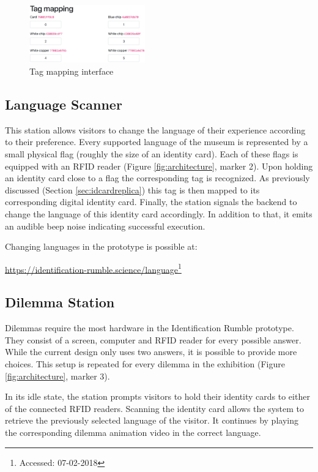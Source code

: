 \begin{figure}[h]
  \includegraphics[width=5cm]{assets/mapping-interface.png}
  \caption{Tag mapping interface}
  \centering
  \label{fig:mappinginterface}
\end{figure}


\subsection{Language Scanner}
This station allows visitors to change the language of their experience according to their preference.
Every supported language of the museum is represented by a small physical flag (roughly the size of an identity card).
Each of these flags is equipped with an RFID reader (Figure \ref{fig:architecture}, marker 2).
Upon holding an identity card close to a flag the corresponding tag is recognized.
As previously discussed (Section \ref{sec:idcardreplica}) this tag is then mapped to its corresponding digital identity card.
Finally, the station signals the backend to change the language of this identity card accordingly.
In addition to that, it emits an audible beep noise indicating successful execution.

Changing languages in the prototype is possible at:

\begin{flushleft}
  \url{https://identification-rumble.science/language}\footnote{Accessed: 07-02-2018}
\end{flushleft}


\subsection{Dilemma Station}
Dilemmas require the most hardware in the Identification Rumble prototype.
They consist of a screen, computer and RFID reader for every possible answer.
While the current design only uses two answers, it is possible to provide more choices.
This setup is repeated for every dilemma in the exhibition (Figure \ref{fig:architecture}, marker 3).

In its idle state, the station prompts visitors to hold their identity cards to either of the connected RFID readers.
Scanning the identity card allows the system to retrieve the previously selected language of the visitor.
It continues by playing the corresponding dilemma animation video in the correct language.

